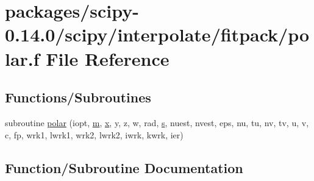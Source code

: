 \hypertarget{polar_8f}{}\section{packages/scipy-\/0.14.0/scipy/interpolate/fitpack/polar.f File Reference}
\label{polar_8f}
\subsection*{Functions/\+Subroutines}
\begin{DoxyCompactItemize}
\item 
subroutine \hyperlink{polar_8f_a0d3f30939c83c4da38a5b3c7f9a3abf4}{polar} (iopt, \hyperlink{indexexpr_8h_ab72fdb4031d47b75ab26dd18a437bcdc}{m}, \hyperlink{vecnorm1_8cc_ac73eed9e41ec09d58f112f06c2d6cb63}{x}, y, z, w, rad, \hyperlink{indexexpr_8h_ae024b0db549122b44c349ae28ec990dc}{s}, nuest, nvest, eps, nu, tu, nv, tv, u, v, c, fp, wrk1, lwrk1, wrk2, lwrk2, iwrk, kwrk, ier)
\end{DoxyCompactItemize}


\subsection{Function/\+Subroutine Documentation}
\hypertarget{polar_8f_a0d3f30939c83c4da38a5b3c7f9a3abf4}{}
